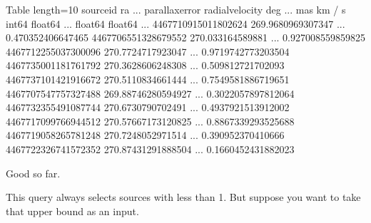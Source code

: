 \documentclass[letterpaper,10pt,english]{sphinxmanual}
\begin{document}
\begin{sphinxVerbatim}[commandchars=\\\{\}]
  
\end{sphinxVerbatim}

\begin{sphinxVerbatim}[commandchars=\\\{\}]
\PYGZlt{}Table length=10\PYGZgt{}
     source\PYGZus{}id              ra         ...   parallax\PYGZus{}error   radial\PYGZus{}velocity
                           deg         ...        mas              km / s    
       int64             float64       ...      float64           float64    
\PYGZhy{}\PYGZhy{}\PYGZhy{}\PYGZhy{}\PYGZhy{}\PYGZhy{}\PYGZhy{}\PYGZhy{}\PYGZhy{}\PYGZhy{}\PYGZhy{}\PYGZhy{}\PYGZhy{}\PYGZhy{}\PYGZhy{}\PYGZhy{}\PYGZhy{}\PYGZhy{}\PYGZhy{} \PYGZhy{}\PYGZhy{}\PYGZhy{}\PYGZhy{}\PYGZhy{}\PYGZhy{}\PYGZhy{}\PYGZhy{}\PYGZhy{}\PYGZhy{}\PYGZhy{}\PYGZhy{}\PYGZhy{}\PYGZhy{}\PYGZhy{}\PYGZhy{}\PYGZhy{}\PYGZhy{} ... \PYGZhy{}\PYGZhy{}\PYGZhy{}\PYGZhy{}\PYGZhy{}\PYGZhy{}\PYGZhy{}\PYGZhy{}\PYGZhy{}\PYGZhy{}\PYGZhy{}\PYGZhy{}\PYGZhy{}\PYGZhy{}\PYGZhy{}\PYGZhy{}\PYGZhy{}\PYGZhy{} \PYGZhy{}\PYGZhy{}\PYGZhy{}\PYGZhy{}\PYGZhy{}\PYGZhy{}\PYGZhy{}\PYGZhy{}\PYGZhy{}\PYGZhy{}\PYGZhy{}\PYGZhy{}\PYGZhy{}\PYGZhy{}\PYGZhy{}
4467710915011802624  269.9680969307347 ...  0.470352406647465              \PYGZhy{}\PYGZhy{}
4467706551328679552   270.033164589881 ...  0.927008559859825              \PYGZhy{}\PYGZhy{}
4467712255037300096  270.7724717923047 ... 0.9719742773203504              \PYGZhy{}\PYGZhy{}
4467735001181761792  270.3628606248308 ...  0.509812721702093              \PYGZhy{}\PYGZhy{}
4467737101421916672  270.5110834661444 ... 0.7549581886719651              \PYGZhy{}\PYGZhy{}
4467707547757327488 269.88746280594927 ... 0.3022057897812064              \PYGZhy{}\PYGZhy{}
4467732355491087744  270.6730790702491 ... 0.4937921513912002              \PYGZhy{}\PYGZhy{}
4467717099766944512 270.57667173120825 ... 0.8867339293525688              \PYGZhy{}\PYGZhy{}
4467719058265781248  270.7248052971514 ...  0.390952370410666              \PYGZhy{}\PYGZhy{}
4467722326741572352 270.87431291888504 ... 0.1660452431882023              \PYGZhy{}\PYGZhy{}
\end{sphinxVerbatim}

Good so far.

 This query always selects sources with  less than 1.  But suppose you want to take that upper bound as an input.
\end{document}
